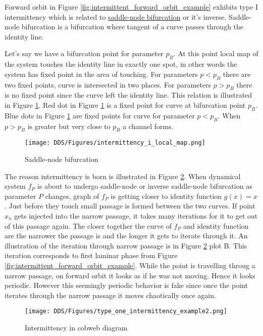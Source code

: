 Forward orbit in Figure \ref{fig:intermittent_forward_orbit_example} exhibits type I intermittency which is related to \hyperref[def:saddle_node_bif]{saddle-node bifurcation} or it's inverse.
Saddle-node bifurcation is a bifurcation where tangent of a curve passes through the identity line.
\par
Let's say we have a bifurcation point for parameter $p_{B}$.
At this point local map of the system touches the identity line in exactly one spot, in other words the system has fixed point in the area of touching.
For parameters $p < p_{B}$ there are two fixed points, curve is intersected in two places.
For parameters $p > p_{B}$ there is no fixed point since the curve left the identity line.
This relation is illustrated in Figure \ref{fig:saddle_node_bifurcation}.
Red dot in Figure \ref{fig:saddle_node_bifurcation} is a fixed point for curve at bifurcation point $p_{B}$.
Blue dots in Figure \ref{fig:saddle_node_bifurcation} are fixed points for curve for parameter $p < p_{B}$.
When $p > p_{B}$ is greater but very close to $p_{B}$ a channel forms.
\begin{figure}[!h]
    \centering
    \texttt{[image: DDS/Figures/intermittency\_i\_local\_map.png]}
    \caption{Saddle-node bifurcation}
    \label{fig:saddle_node_bifurcation}
\end{figure}


The reason intermittency is born is illustrated in Figure \ref{fig:intermittent_cobweb_example}.
When dynamical system $f_P$ is about to undergo saddle-node or inverse saddle-node bifurcation as parameter $P$ changes, graph of $f_P$ is getting closer to identity function $g(x)=x$.
Just before they touch small passage is formed between the two curves.
If point $x_n$ gets injected into the narrow passage, it takes many iterations for it to get out of this passage again.
The closer together the curve of $f_P$ and identity function are the narrower the passage is and the longer it gets to iterate through it.
An illustration of the iteration through narrow passage is in Figure \ref{fig:intermittent_cobweb_example} plot B.
This iteration corresponds to first laminar phase from Figure \ref{fig:intermittent_forward_orbit_example}.
While the point is travelling throug a narrow passage, on forward orbit it looks as if he was not moving.
Hence it looks periodic.
However this seemingly periodic behavior is fake since once the point iterates through the narrow passage it moves chaotically once again.

\begin{figure}[!h]
    \centering
    \texttt{[image: DDS/Figures/type\_one\_intermittency\_example2.png]}
    \caption{Intermittency in cobweb diagram}
    \label{fig:intermittent_cobweb_example}
\end{figure}

